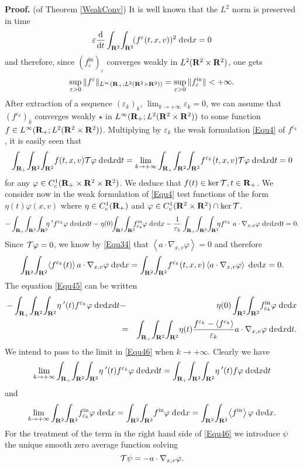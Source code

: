 \documentclass[12pt, a4paper]{article}
\providecommand\mathbb{\bf}
\newcommand\R{{\mathbb R}}
\newcounter{steps}
\newenvironment{proof}[1][]{%
\par\medbreak\setcounter{steps}{0}
{\noindent\bfseries Proof#1. }} {\hfill\fbox{\ }\medbreak}
\newcommand{\intxv}[1]{
\int _{\R^2}\!\int _{\R^2} \!#1 \;\mathrm{d}v\mathrm{d}x}
\newcommand{\inttxv}[1]{
\int _{\R_+} \! \int _{\R^2}\!\int _{\R^2} \!#1 \;\mathrm{d}v\mathrm{d}x\mathrm{d}t}
\newcommand{\coctxv}[0]{
C^1 _c (\R_+ \times \R ^2 \times \R ^2)}
\newcommand{\coct}[0]{
C^1 _c (\R_+)}
\newcommand{\cocxv}[0]{
C^1 _c (\R ^2 \times \R ^2)}
\newcommand{\eps}[0]{
\varepsilon}
\newcommand{\epsk}[0]{
\varepsilon _k}
\newcommand{\fe}[0]{
f ^\varepsilon}
\newcommand{\fek}[0]{
f ^{\varepsilon _k}}
\newcommand{\fin}[0]{
f ^{\mathrm{in}}}
\newcommand{\fine}[0]{
f ^{\mathrm{in}}_{\varepsilon}}
\newcommand{\finek}[0]{
f ^{\mathrm{in}}_{\varepsilon _k}}
\newcommand{\ltxv}[0]{
L^2(\R ^2 \times \R ^2)}
\newcommand{\nxv}[0]{
\nabla_{x,v}}
\newcommand{\limk}[0]{
\lim _{k \to +\infty}}
\newcommand{\ave}[1]{
\left \langle #1 \right \rangle }
\begin{document}
\begin{proof} (of Theorem \ref{WeakConv})
It is well known that the $L^2$ norm is preserved in time
\[
\eps \frac{\mathrm{d}}{\mathrm{d}t} \intxv{ (\fe (t,x,v)) ^2} = 0 
\]
and therefore, since $(\fine)_\eps$ converges weakly in $\ltxv$, one gets 
\[
\sup _{\eps >0} \|\fe \|_{L^\infty(\R_+;\ltxv{})} = \sup _{\eps >0} \|\fine\| < +\infty.
\]
After extraction of a sequence $(\eps _k)_k$, $\limk \eps _k = 0$, we can assume that $(\fek)_k$ converges weakly $\star$ in $L^\infty(\R_+;\ltxv{})$ to some function $f \in L^\infty(\R_+;\ltxv{})$. Multiplying by $\epsk$ the weak formulation \eqref{Equ4} of $\fek$, it is easily seen that
\[
\inttxv{f(t,x,v) {\cal T} \varphi } = \limk \inttxv{\fek (t,x,v) {\cal T}\varphi } = 0
\]
for any $\varphi \in \coctxv{}$. We deduce that $f(t) \in \ker {\cal T}, t \in \R_+$. We consider now in the weak formulation of \eqref{Equ4} test functions of the form $\eta (t) \varphi (x,v)$ where $\eta \in \coct$ and $\varphi \in \cocxv \cap \ker {\cal T}$. 
\begin{equation}
\label{Equ45} - \inttxv{\!\!\eta ^{\;\prime}  \fek \varphi } - \eta (0) \!\!\intxv{\!\!\finek \varphi } - \frac{1}{\epsk} \inttxv{\!\!\eta  \fek \;a \cdot \nxv \varphi} = 0.
\end{equation}
Since ${\cal T } \varphi = 0$, we know by \eqref{Equ34} that $\ave{a \cdot \nxv \varphi } = 0$ and therefore
\[
\intxv{\ave{\fek (t)} a \cdot \nxv \varphi } = \intxv{\fek (t,x,v) \ave{a \cdot \nxv \varphi }} = 0.
\]
The equation \eqref{Equ45} can be written
\begin{eqnarray}
\label{Equ46} - \inttxv{\eta ^ {\;\prime} (t) \fek \varphi }  & - & \eta (0)\intxv{\finek \varphi }  \\
& = &  \inttxv{\eta (t) \frac{\fek - \ave{\fek}}{\epsk} a\cdot \nxv \varphi }.\nonumber
\end{eqnarray}
We intend to pass to the limit in \eqref{Equ46} when $k \to +\infty$. Clearly we have
\begin{equation}
\label{Equ48} \limk \inttxv{\eta ^{\;\prime} (t) \fek \varphi }= \inttxv{\eta ^{\;\prime} (t) f \varphi }
\end{equation}
and
\begin{equation}
\label{Equ49}
\limk \intxv{\finek \varphi } = \intxv{\fin \varphi } = \intxv{\ave{\fin} \varphi }.
\end{equation} 
For the treatment of the term in the right hand side of \eqref{Equ46} we introduce $\psi$ the unique smooth zero average function solving 
\[
{\cal T} \psi = - a \cdot \nxv \varphi.
\]
\end{proof}
\end{document}
